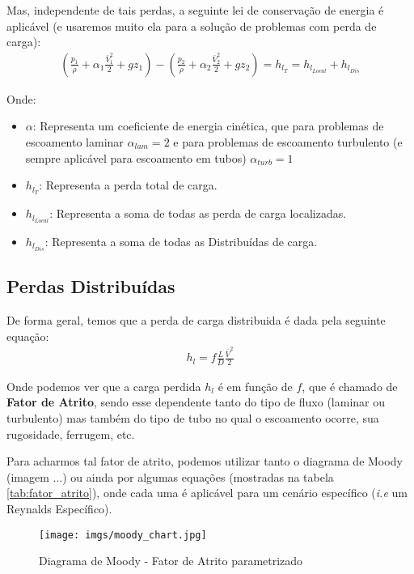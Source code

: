 \documentclass{article}
\begin{document}
Mas, independente de tais perdas, a seguinte lei de conservação de energia é aplicável (e usaremos muito ela para a solução de problemas com perda de carga):
\begin{align}
    \left(\frac{p_1}{\rho} + \alpha_1 \frac{\bar{V}^2_1}{2} + gz_1\right) - \left(\frac{p_2}{\rho} + \alpha_2 \frac{\bar{V}^2_2}{2} + gz_2\right) = h_{l_{T}} = h_{l_{Local}} + h_{l_{Dis}}
\end{align}

Onde:
\begin{itemize}
    \item $\alpha$: Representa um coeficiente de energia cinética, que para problemas de escoamento laminar $\alpha_{lam} = 2$ e para problemas de escoamento turbulento (e sempre aplicável para escoamento em tubos) $\alpha_{turb} = 1$
    \item $h_{l_{T}}$: Representa a perda total de carga.
    \item $h_{l_{Local}}$: Representa a soma de todas as perda de carga localizadas.
    \item $h_{l_{Dis}}$: Representa a soma de todas as Distribuídas de carga.
\end{itemize}

\newpage
\subsection{Perdas Distribuídas}

De forma geral, temos que a perda de carga distribuida é dada pela seguinte equação:
\begin{align}
    h_{l} = f \frac{L}{D}\frac{\bar{V}^2}{2}
    \label{eq:carg_dis_laminar}
\end{align}

Onde podemos ver que a carga perdida $h_l$ é em função de $f$, que é chamado de \textbf{Fator de Atrito}, sendo esse dependente tanto do tipo de fluxo (laminar ou turbulento) mas também do tipo de tubo no qual o escoamento ocorre, sua rugosidade, ferrugem, etc.

Para acharmos tal fator de atrito, podemos utilizar tanto o diagrama de Moody (imagem ...) ou ainda por algumas equações (mostradas na tabela \ref{tab:fator_atrito}), onde cada uma é aplicável para um cenário específico (\emph{i.e} um Reynalds Específico).

\begin{figure}[h]
    \centering
    \texttt{[image: imgs/moody\_chart.jpg]}
    \caption{Diagrama de Moody - Fator de Atrito parametrizado}
\end{figure}
\end{document}
